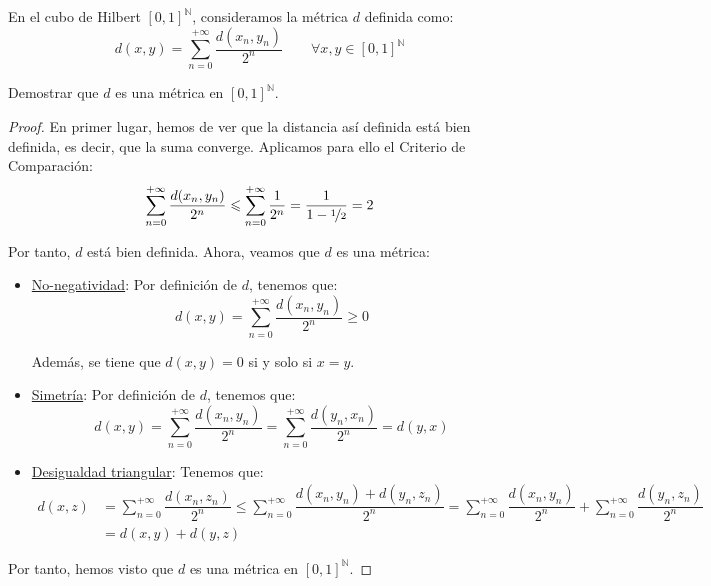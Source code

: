 \begin{ejercicio}
    En el cubo de Hilbert ${[0,1]}^{\mathbb{N}}$, consideramos la métrica $d$ definida como:
    \begin{equation*}
        d(x,y) = \sum_{n=0}^{+\infty} \dfrac{d(x_n,y_n)}{2^n} \qquad \forall x,y\in {[0,1]}^{\mathbb{N}}
    \end{equation*}


    Demostrar que $d$ es una métrica en ${[0,1]}^{\mathbb{N}}$.
    \begin{proof}
        En primer lugar, hemos de ver que la distancia así definida está bien definida, es decir, que la suma converge. Aplicamos para ello el Criterio de Comparación:
        \begin{equation*}
            \sum_{n=0}^{+\infty} \dfrac{d(x_n,y_n)}{2^n} \leq \sum_{n=0}^{+\infty} \dfrac{1}{2^n} = \dfrac{1}{1-\nicefrac{1}{2}} = 2
        \end{equation*}

        Por tanto, $d$ está bien definida. Ahora, veamos que $d$ es una métrica:
        \begin{itemize}
            \item \underline{No-negatividad}: Por definición de $d$, tenemos que:
                \begin{equation*}
                    d(x,y) = \sum_{n=0}^{+\infty} \dfrac{d(x_n,y_n)}{2^n} \geq 0
                \end{equation*}

                Además, se tiene que $d(x,y) = 0$ si y solo si $x = y$.
            \item \underline{Simetría}: Por definición de $d$, tenemos que:
                \begin{equation*}
                    d(x,y) = \sum_{n=0}^{+\infty} \dfrac{d(x_n,y_n)}{2^n} = \sum_{n=0}^{+\infty} \dfrac{d(y_n,x_n)}{2^n} = d(y,x)
                \end{equation*}
            \item \underline{Desigualdad triangular}: Tenemos que:
                \begin{align*}
                    d(x,z) &= \sum_{n=0}^{+\infty} \dfrac{d(x_n,z_n)}{2^n}
                    \leq \sum_{n=0}^{+\infty} \dfrac{d(x_n,y_n) + d(y_n,z_n)}{2^n}
                    = \sum_{n=0}^{+\infty} \dfrac{d(x_n,y_n)}{2^n} + \sum_{n=0}^{+\infty} \dfrac{d(y_n,z_n)}{2^n} \\
                    &= d(x,y) + d(y,z)
                \end{align*}
            \end{itemize}
        Por tanto, hemos visto que $d$ es una métrica en ${[0,1]}^{\mathbb{N}}$.
    \end{proof}
\end{ejercicio}


